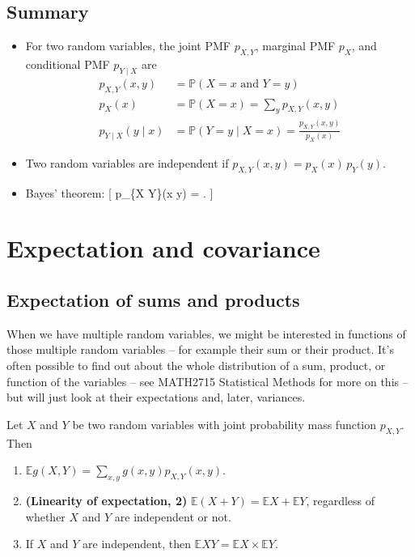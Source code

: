 \documentclass[
  letterpaper,
]{report}
\providecommand{\tightlist}{%
  \setlength{\itemsep}{0pt}\setlength{\parskip}{0pt}}\usepackage{longtable,booktabs,array}
\theoremstyle{definition}
\theoremstyle{definition}
\theoremstyle{remark}
\begin{document}
\hypertarget{summary-L13}{%
\section*{Summary}\label{summary-L13}}


\begin{itemize}
\tightlist
\item
  For two random variables, the joint PMF \(p_{X,Y}\), marginal PMF
  \(p_X\), and conditional PMF \(p_{Y \mid X}\) are \begin{align*}
  p_{X,Y}(x,y) &= \mathbb P(X =x \text{ and } Y = y) \\
  p_X(x) &= \mathbb P(X = x) = \sum_y p_{X,Y}(x,y) \\
  p_{Y \mid X}(y \mid x) &= \mathbb P(Y = y \mid X = x) = \frac{p_{X,Y}(x,y)}{p_X(x)} 
  \end{align*}
\item
  Two random variables are independent if
  \(p_{X,Y}(x,y) = p_X(x) \, p_Y(y)\).
\item
  Bayes' theorem: {[} p\_\{X \mid Y\}(x \mid y) =
   . {]}
\end{itemize}

\hypertarget{L14-covariance}{%
\chapter{Expectation and covariance}\label{L14-covariance}}

\hypertarget{sum-product}{%
\section{Expectation of sums and products}\label{sum-product}}

When we have multiple random variables, we might be interested in
functions of those multiple random variables -- for example their sum or
their product. It's often possible to find out about the whole
distribution of a sum, product, or function of the variables -- see
MATH2715 Statistical Methods for more on this -- but will just look at
their expectations and, later, variances.

\leavevmode{}%
Let \(X\) and \(Y\) be two random variables with joint probability mass
function \(p_{X,Y}\). Then

\begin{enumerate}
\def\labelenumi{\arabic{enumi}.}
\tightlist
\item
  \(\mathbb Eg(X,Y) = \displaystyle\sum_{x,y} g(x,y) p_{X,Y}(x,y)\).
\item
  \textbf{(Linearity of expectation, 2)}
  \(\mathbb E(X + Y) = \mathbb EX + \mathbb EY\), regardless of whether
  \(X\) and \(Y\) are independent or not.
\item
  If \(X\) and \(Y\) are independent, then
  \(\mathbb EXY = \mathbb EX \times \mathbb EY\).
\end{enumerate}
\end{document}
